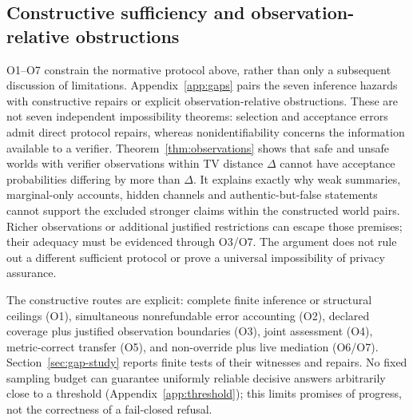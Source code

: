 \subsection{Constructive sufficiency and observation-relative obstructions}
\label{sec:gaps}
O1--O7 constrain the normative protocol above, rather than only a subsequent
discussion of limitations. Appendix~\ref{app:gaps} pairs the seven inference
hazards with constructive repairs or explicit observation-relative
obstructions. These are not seven independent impossibility theorems:
selection and acceptance errors admit direct protocol repairs, whereas
nonidentifiability concerns the information available to a verifier.
Theorem~\ref{thm:observations} shows that safe and unsafe worlds with verifier
observations within TV distance $\Delta$ cannot have acceptance probabilities
differing by more than $\Delta$. It explains exactly why weak summaries,
marginal-only accounts, hidden channels and authentic-but-false statements
cannot support the excluded stronger claims within the constructed world
pairs. Richer observations or additional justified restrictions can escape
those premises; their adequacy must be evidenced through O3/O7. The argument
does not rule out a different sufficient protocol or prove a universal
impossibility of privacy assurance.

The constructive routes are explicit: complete finite inference or structural
ceilings (O1), simultaneous nonrefundable error accounting (O2), declared
coverage plus justified observation boundaries (O3), joint assessment (O4),
metric-correct transfer (O5), and non-override plus live mediation (O6/O7).
Section~\ref{sec:gap-study} reports finite tests of their witnesses and repairs.
No fixed sampling budget can guarantee uniformly reliable decisive answers
arbitrarily close to a threshold (Appendix~\ref{app:threshold}); this limits
promises of progress, not the correctness of a fail-closed refusal.

